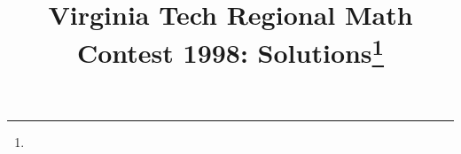 \documentclass[10pt]{article}
\begin{document}
\title{Virginia Tech Regional Math Contest 1998: Solutions\footnote{\disclaimer}}
\author{\vspace{-2ex}}
\date{\vspace{-5ex}} %
\maketitle

%

%

%

%

%

%
\end{document}
